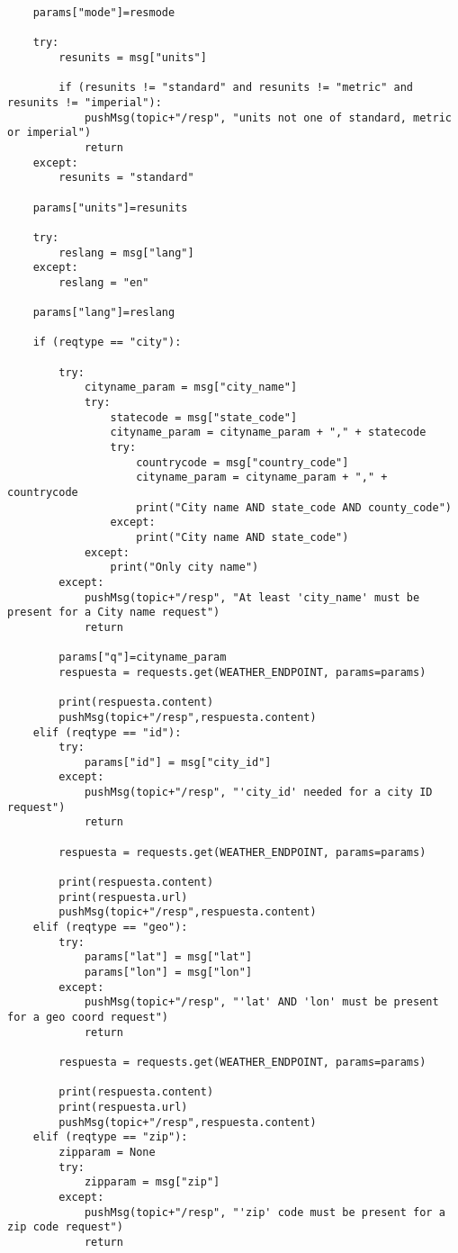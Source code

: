 \documentclass{scrbook}
\begin{document}
{\begin{verbatim}
    params["mode"]=resmode

    try:
        resunits = msg["units"]

        if (resunits != "standard" and resunits != "metric" and resunits != "imperial"):
            pushMsg(topic+"/resp", "units not one of standard, metric or imperial")
            return
    except:
        resunits = "standard"

    params["units"]=resunits

    try:
        reslang = msg["lang"]
    except:
        reslang = "en"

    params["lang"]=reslang

    if (reqtype == "city"):

        try:
            cityname_param = msg["city_name"]
            try:
                statecode = msg["state_code"]
                cityname_param = cityname_param + "," + statecode
                try:
                    countrycode = msg["country_code"]
                    cityname_param = cityname_param + "," + countrycode
                    print("City name AND state_code AND county_code")
                except:
                    print("City name AND state_code")
            except:
                print("Only city name")
        except:
            pushMsg(topic+"/resp", "At least 'city_name' must be present for a City name request")
            return

        params["q"]=cityname_param
        respuesta = requests.get(WEATHER_ENDPOINT, params=params)

        print(respuesta.content)
        pushMsg(topic+"/resp",respuesta.content)     
    elif (reqtype == "id"):
        try:
            params["id"] = msg["city_id"]
        except:
            pushMsg(topic+"/resp", "'city_id' needed for a city ID request")
            return

        respuesta = requests.get(WEATHER_ENDPOINT, params=params)

        print(respuesta.content)
        print(respuesta.url)
        pushMsg(topic+"/resp",respuesta.content)
    elif (reqtype == "geo"):
        try:
            params["lat"] = msg["lat"]
            params["lon"] = msg["lon"]
        except:
            pushMsg(topic+"/resp", "'lat' AND 'lon' must be present for a geo coord request")
            return
            
        respuesta = requests.get(WEATHER_ENDPOINT, params=params)

        print(respuesta.content)
        print(respuesta.url)
        pushMsg(topic+"/resp",respuesta.content)
    elif (reqtype == "zip"):
        zipparam = None
        try:
            zipparam = msg["zip"]
        except:
            pushMsg(topic+"/resp", "'zip' code must be present for a zip code request")
            return


\end{verbatim}}
\end{document}
